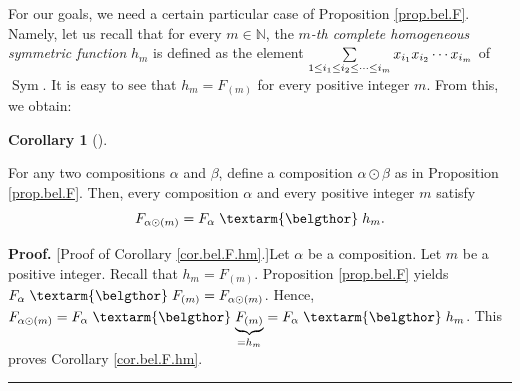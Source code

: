 \documentclass[numbers=enddot,12pt,final,onecolumn,notitlepage,abstracton]{scrartcl}%
\theoremstyle{definition}
\newtheorem{coro}[theo]{Corollary}
\newenvironment{corollary}[1][]
{\begin{coro}[#1]\begin{leftbar}}
{\end{leftbar}\end{coro}}
\newenvironment{proof}[1][Proof]{\noindent\textbf{#1.} }{\ \rule{0.5em}{0.5em}}
\newenvironment{verlong}{}{}
\newcommand{\bel}{\left. \textarm{\belgthor} \right.}
\let\sumnonlimits\sum
\renewcommand{\sum}{\sumnonlimits\limits}
\begin{document}
For our goals, we need a certain particular case of Proposition
\ref{prop.bel.F}. Namely, let us recall that for every $m\in\mathbb{N}$, the
$m$\textit{-th complete homogeneous symmetric function} $h_{m}$ is defined as
the element $\sum\limits_{1\leq i_{1}\leq i_{2}\leq\cdots\leq i_{m}}x_{i_{1}%
}x_{i_{2}}\cdots x_{i_{m}}$ of $\operatorname*{Sym}$. It is easy to see that
$h_{m}=F_{\left(  m\right)  }$ for every positive integer $m$. From this, we obtain:

\begin{corollary}
\label{cor.bel.F.hm}For any two compositions $\alpha$ and $\beta$, define a
composition $\alpha\odot\beta$ as in Proposition \ref{prop.bel.F}. Then, every
composition $\alpha$ and every positive integer $m$ satisfy%
\begin{equation}
F_{\alpha\odot\left(  m\right)  }=F_{\alpha} \bel h_{m}. \label{pf.hmDless.2}%
\end{equation}

\end{corollary}

\begin{verlong}
\begin{proof}
[Proof of Corollary \ref{cor.bel.F.hm}.]Let $\alpha$ be a composition. Let $m$
be a positive integer. Recall that $h_{m}=F_{\left(  m\right)  }$. Proposition
\ref{prop.bel.F} yields $F_{\alpha} \bel F_{\left(  m\right)  }=F_{\alpha
\odot\left(  m\right)  }$. Hence, $F_{\alpha\odot\left(  m\right)  }%
=F_{\alpha} \bel \underbrace{F_{\left(  m\right)  }}_{=h_{m}}=F_{\alpha}
\bel h_{m}$. This proves Corollary \ref{cor.bel.F.hm}.
\end{proof}
\end{verlong}
\end{document}
